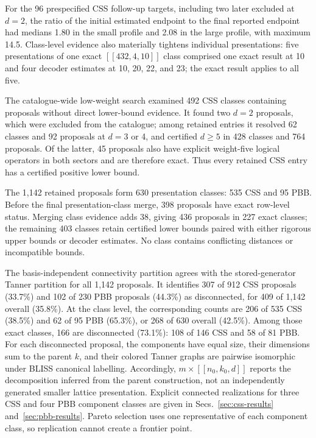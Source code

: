 \documentclass[aps,prx,twocolumn,superscriptaddress,nofootinbib,floatfix]{revtex4-2}
\newcommand{\code}[1]{\ensuremath{\left[\!\left[#1\right]\!\right]}}
\begin{document}
For the 96 prespecified CSS follow-up targets, including two later excluded at
$d=2$, the ratio of the initial estimated endpoint to the final reported
endpoint had medians 1.80 in the small profile and 2.08 in the large
profile, with maximum 14.5.  Class-level evidence also
materially tightens individual presentations: five presentations of one exact
$\code{432,4,10}$ class comprised one exact result at 10 and four decoder
estimates at 10, 20, 22, and 23; the exact result applies to all five.

The catalogue-wide low-weight search examined 492 CSS classes containing
proposals without direct lower-bound evidence.  It found two $d=2$ proposals,
which were excluded from the catalogue;
among retained entries it resolved 62 classes and 92 proposals at $d=3$ or 4,
and certified $d\geq5$ in 428 classes and 764 proposals.  Of the latter, 45
proposals also have explicit weight-five logical operators in both sectors and
are therefore exact.  Thus every retained CSS entry has a certified positive
lower bound.

The 1,142 retained proposals form 630 presentation classes: 535 CSS and 95
PBB.  Before the final presentation-class merge, 398 proposals have exact
row-level status.  Merging class evidence adds 38, giving 436 proposals in 227
exact classes; the remaining 403
classes retain certified lower bounds paired with either rigorous upper bounds
or decoder estimates.  No class contains conflicting distances or incompatible
bounds.

The basis-independent connectivity partition agrees with the stored-generator
Tanner partition for all 1,142 proposals.  It identifies 307 of 912 CSS
proposals (33.7\%) and 102 of 230 PBB proposals (44.3\%) as disconnected, for
409 of 1,142
overall (35.8\%).  At the class level, the corresponding counts are 206 of 535 CSS
(38.5\%) and 62 of 95 PBB (65.3\%), or 268 of 630 overall (42.5\%).  Among
those exact classes, 166 are disconnected (73.1\%): 108 of 146 CSS and 58 of 81
PBB.  For each disconnected proposal, the components have
equal size, their dimensions sum to the parent $k$, and their colored Tanner
graphs are pairwise isomorphic under BLISS canonical labelling.  Accordingly,
$m\times\code{n_0,k_0,d}$ reports the decomposition inferred from the parent
construction, not an independently generated smaller lattice presentation.
Explicit connected realizations for three CSS and four PBB component classes
are given in Secs.~\ref{sec:css-results} and~\ref{sec:pbb-results}.  Pareto
selection uses one representative of each component class, so replication
cannot create a frontier point.
\end{document}

